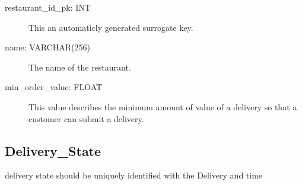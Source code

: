 	\begin{description}
		\item[restaurant\_id\_pk: INT] This an automaticly generated surrogate key.
		\item[name: VARCHAR(256)] The name of the restaurant.
		\item[min\_order\_value: FLOAT] This value describes the minimum amount of value of a delivery so that a customer can submit a delivery.
	\end{description}

	\subsection{Delivery\_State}
	delivery state should be uniquely identified with the Delivery and time
